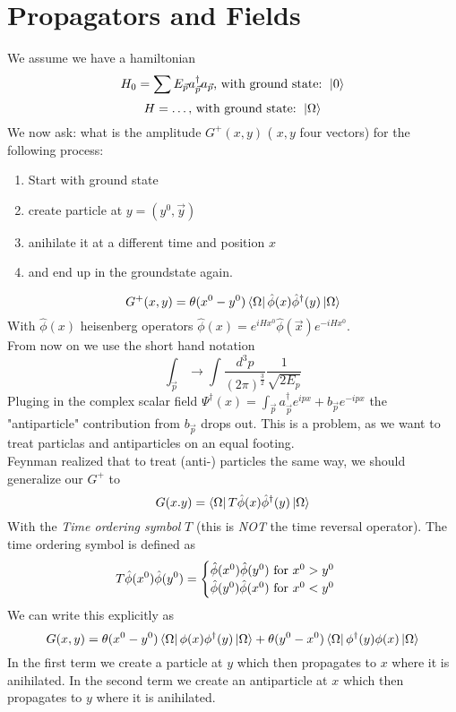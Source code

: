 \documentclass{report}
\begin{document}
\chapter{Propagators and Fields}
We assume we have a hamiltonian \[
	H_0 = \sum E_{\vec{p}} a^\dagger_{\vec{p}} a_{\vec{p}} \text{, with ground state: } \ket{0}
\] \[
H = \ldots \text{, with ground state: } \ket{\Omega}
\] 
We now ask: what is the amplitude $G^+(x,y)$ ( $x,y$ four vectors) for the following process:
\begin{enumerate}
	\item Start with ground state
	\item create particle at $y = (y^0, \vec{y})$
	\item anihilate it at a different time and position $x$
	\item and end up in the groundstate again.
\end{enumerate}
\[
	G^+(x,y) = \theta(x^0 - y^0) \bra{\Omega} \hat{\phi }(x) \hat{\phi }^\dagger(y) \ket{\Omega}
\] With $\hat{\phi }(x)$ heisenberg operators $\hat{\phi}(x) = e^{iHx^0} \hat{\phi}(\vec{x}) e^{-iHx^0}$.\\
From now on we use the short hand notation \[
	\int_{\vec{p}} \to \int \frac{d^3p}{\left( 2 \pi \right)^{\frac{3}{2}} } \frac{1}{\sqrt{2 E_p} }
\] Pluging in the complex scalar field $\Psi^\dagger(x) = \int_{\vec{p}} a^\dagger_{\vec{p}} e^{ipx} + b_{\vec{p}} e^{-ipx}$ the "antiparticle" contribution from $b_{\vec{p}}$ drops out. This is a problem, as we want to treat particlas and antiparticles on an equal footing.\\
Feynman realized that to treat (anti-) particles the same way, we should generalize our $G^+$ to \[
	G(x.y) = \bra{\Omega} T \hat{\phi }(x) \hat{\phi }^\dagger(y) \ket{\Omega}
\] With the \emph{Time ordering symbol} $T$ (this is \emph{NOT} the time reversal operator). The time ordering symbol is defined as  \[
T \hat{\phi}(x^0) \hat{\phi }(y^0) =  \begin{cases}
	\hat{\phi}(x^0) \hat{\phi }(y^0) \text{ for } x^0 > y^0 \\
	\hat{\phi}(y^0) \hat{\phi}(x^0) \text{ for } x^0 < y^0
\end{cases} \\
\] We can write this explicitly as \[
G(x,y) = \theta(x^0 - y^0) \bra{\Omega}\phi(x) \phi^\dagger(y)\ket{\Omega} + \theta(y^0 - x^0) \bra{\Omega} \phi^\dagger(y) \phi(x) \ket{\Omega}
\] 
In the first term we create a particle at $y$ which then propagates to $x$ where it is anihilated. In the second term we create an antiparticle at $x$ which then propagates to $y$ where it is anihilated.\\
\end{document}
